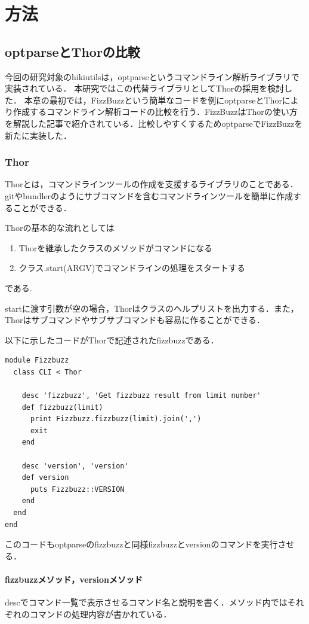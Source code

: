 
\section{方法}
\subsection{optparseとThorの比較}
今回の研究対象のhikiutilsは，optparseというコマンドライン解析ライブラリで実装されている．
本研究ではこの代替ライブラリとしてThorの採用を検討した．
本章の最初では，FizzBuzzという簡単なコードを例にoptparseとThorにより作成するコマンドライン解析コードの比較を行う．FizzBuzzはThorの使い方を解説した記事\cite{1-2}で紹介されている．比較しやすくするためoptparseでFizzBuzzを新たに実装した．

\subsubsection{Thor}
Thorとは，コマンドラインツールの作成を支援するライブラリのことである．gitやbundlerのようにサブコマンドを含むコマンドラインツールを簡単に作成することができる\cite{1-2}．

Thorの基本的な流れとしては

\begin{enumerate}
\item Thorを継承したクラスのメソッドがコマンドになる
\item クラス.start(ARGV)でコマンドラインの処理をスタートする
\end{enumerate}
である\cite{1-2}.

startに渡す引数が空の場合，Thorはクラスのヘルプリストを出力する．また，Thorはサブコマンドやサブサブコマンドも容易に作ることができる．

以下に示したコードがThorで記述されたfizzbuzzである．
\begin{lstlisting}[style=customRuby,basicstyle={\scriptsize\ttfamily}]
module Fizzbuzz                                                   
  class CLI < Thor

    desc 'fizzbuzz', 'Get fizzbuzz result from limit number'
    def fizzbuzz(limit)
      print Fizzbuzz.fizzbuzz(limit).join(',')
      exit
    end

    desc 'version', 'version'
    def version
      puts Fizzbuzz::VERSION
    end
  end
end
\end{lstlisting}
このコードもoptparseのfizzbuzzと同様fizzbuzzとversionのコマンドを実行させる．

\paragraph{fizzbuzzメソッド，versionメソッド}
descでコマンド一覧で表示させるコマンド名と説明を書く．メソッド内ではそれぞれのコマンドの処理内容が書かれている．

